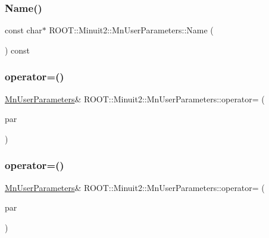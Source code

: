 \subsubsection{\texorpdfstring{Name()}{Name()}\hspace{0.1cm}{\footnotesize\ttfamily [3/3]}}
{\footnotesize\ttfamily const char$\ast$ R\+O\+O\+T\+::\+Minuit2\+::\+Mn\+User\+Parameters\+::\+Name (\begin{DoxyParamCaption}\item[{unsigned int}]{ }\end{DoxyParamCaption}) const}

\mbox{\label{classROOT_1_1Minuit2_1_1MnUserParameters_a21d8a1f70098c2c9c82015cf0867c8ea}} 
\subsubsection{\texorpdfstring{operator=()}{operator=()}\hspace{0.1cm}{\footnotesize\ttfamily [1/3]}}
{\footnotesize\ttfamily \mbox{\hyperlink{classROOT_1_1Minuit2_1_1MnUserParameters}{Mn\+User\+Parameters}}\& R\+O\+O\+T\+::\+Minuit2\+::\+Mn\+User\+Parameters\+::operator= (\begin{DoxyParamCaption}\item[{const \mbox{\hyperlink{classROOT_1_1Minuit2_1_1MnUserParameters}{Mn\+User\+Parameters}} \&}]{par }\end{DoxyParamCaption})\hspace{0.3cm}{\ttfamily [inline]}}

\mbox{\label{classROOT_1_1Minuit2_1_1MnUserParameters_a21d8a1f70098c2c9c82015cf0867c8ea}} 
\subsubsection{\texorpdfstring{operator=()}{operator=()}\hspace{0.1cm}{\footnotesize\ttfamily [2/3]}}
{\footnotesize\ttfamily \mbox{\hyperlink{classROOT_1_1Minuit2_1_1MnUserParameters}{Mn\+User\+Parameters}}\& R\+O\+O\+T\+::\+Minuit2\+::\+Mn\+User\+Parameters\+::operator= (\begin{DoxyParamCaption}\item[{const \mbox{\hyperlink{classROOT_1_1Minuit2_1_1MnUserParameters}{Mn\+User\+Parameters}} \&}]{par }\end{DoxyParamCaption})\hspace{0.3cm}{\ttfamily [inline]}}

